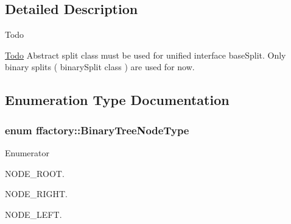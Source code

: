 \subsection{Detailed Description}
\begin{DoxyRefDesc}{Todo}
\item[\hyperlink{todo__todo000005}{Todo}]Abstract split class must be used for unified interface base\-Split. Only binary splits ( binary\-Split class ) are used for now. \end{DoxyRefDesc}


\subsection{Enumeration Type Documentation}
\hypertarget{namespaceffactory_a405b9095f0a093ae4770f7638f0eb730}{
\subsubsection[{Binary\-Tree\-Node\-Type}]{\setlength{\rightskip}{0pt plus 5cm}enum {\bf ffactory\-::\-Binary\-Tree\-Node\-Type}}}\label{namespaceffactory_a405b9095f0a093ae4770f7638f0eb730}
\begin{Desc}
\item[Enumerator]\par
\begin{description}
\item[{\em 
\hypertarget{namespaceffactory_a405b9095f0a093ae4770f7638f0eb730a80f4791740f2e7819cbbebffa5171d19}{N\-O\-D\-E\-\_\-\-R\-O\-O\-T}\label{namespaceffactory_a405b9095f0a093ae4770f7638f0eb730a80f4791740f2e7819cbbebffa5171d19}
}]N\-O\-D\-E\-\_\-\-R\-O\-O\-T. \item[{\em 
\hypertarget{namespaceffactory_a405b9095f0a093ae4770f7638f0eb730ad5fe1f87cc4d82b19e470c523b1d7056}{N\-O\-D\-E\-\_\-\-R\-I\-G\-H\-T}\label{namespaceffactory_a405b9095f0a093ae4770f7638f0eb730ad5fe1f87cc4d82b19e470c523b1d7056}
}]N\-O\-D\-E\-\_\-\-R\-I\-G\-H\-T. \item[{\em 
\hypertarget{namespaceffactory_a405b9095f0a093ae4770f7638f0eb730a44033b94a6fec357a0799951eadd50a8}{N\-O\-D\-E\-\_\-\-L\-E\-F\-T}\label{namespaceffactory_a405b9095f0a093ae4770f7638f0eb730a44033b94a6fec357a0799951eadd50a8}
}]N\-O\-D\-E\-\_\-\-L\-E\-F\-T. \end{description}
\end{Desc}
